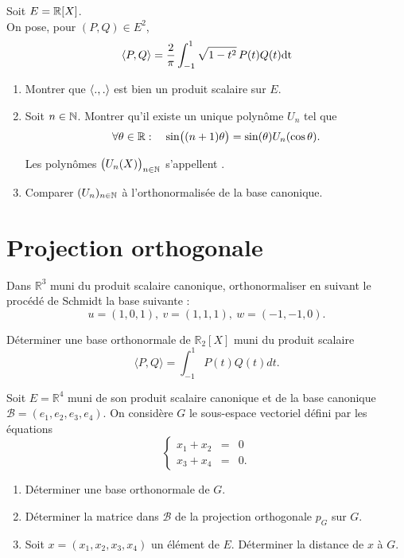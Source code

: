 \documentclass{book}
\begin{document}
 \begin{Exercice}
Soit $E = \mathbb{R}[X]$.\\
On pose, pour $(P,Q)\in E^2$,
\[ \langle P,Q\rangle = \frac 2 \pi \int_{-1}^1\sqrt{1-t^2} \, P(t) Q(t) \mathrm{dt} \]\begin{enumerate}
\item Montrer que $\langle.,.\rangle$ est bien un produit scalaire sur $E$.
\item Soit $n\in\mathbb{N}$. Montrer qu'il existe un unique polynôme $U_n$
  tel que
  \[ \forall \theta\in \mathbb{R}:\quad  \sin\bigl( (n+1)\theta\bigr) = \sin(\theta) U_n(\cos \theta). \]

  Les polynômes $\bigl(U_n(X)\bigr)_{n\in \mathbb{N}}$ s'appellent
 .
\item Comparer $(U_n)_{n\in\mathbb{N}}$ à l'orthonormalisée de la base canonique.
\end{enumerate}
\end{Exercice}
\section{Projection orthogonale}
 \begin{Exercice}
Dans $\mathbb R^3$ muni du produit scalaire canonique, orthonormaliser en suivant le procédé de Schmidt la base suivante :
$$u=(1,0,1),\ v=(1,1,1),\ w=(-1,-1,0).$$
\end{Exercice}
 \begin{Exercice}

Déterminer une base orthonormale de $\mathbb R_2[X]$ muni du produit scalaire 
$$\langle P,Q\rangle=\int_{-1}^1 P(t)Q(t)dt.$$
\end{Exercice}
 \begin{Exercice}
Soit $E=\mathbb R^4$ muni de son produit scalaire canonique et de la base canonique $\mathcal B=(e_1,e_2,e_3,e_4)$. On considère $G$ le sous-espace vectoriel défini par les équations 
$$\left\{
\begin{array}{rcl}
x_1+x_2&=&0\\
x_3+x_4&=&0.
\end{array}
\right.
$$
\begin{enumerate}
\item Déterminer une base orthonormale de $G$.
\item Déterminer la matrice dans $\mathcal B$ de la projection orthogonale $p_G$ sur $G$.
\item Soit $x=(x_1,x_2,x_3,x_4)$ un élément de $E$. Déterminer la distance de $x$ à $G$.
\end{enumerate}
\end{Exercice}
\end{document}
